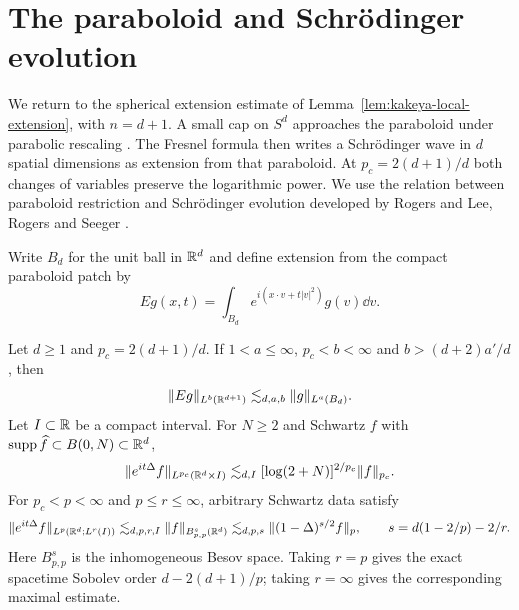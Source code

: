 \section{The paraboloid and Schr\"odinger evolution}\label{sec:parabolic}

We return to the spherical extension estimate of
Lemma~\ref{lem:kakeya-local-extension}, with $n=d+1$. A small cap on
$S^d$ approaches the paraboloid under parabolic rescaling
\cite[\S3, (3.10)--(3.12)]{Hormander1973FLp}. The Fresnel
formula then writes a Schr\"odinger wave in $d$ spatial dimensions as
extension from that paraboloid. At $p_c=2(d+1)/d$ both changes of
variables preserve the logarithmic power. We use the relation between
paraboloid restriction and Schr\"odinger evolution developed by Rogers
\cite{Rogers2008Schrodinger} and Lee, Rogers and Seeger
\cite{LRS2013Schrodinger}.

Write $B_d$ for the unit ball in $\mathbb R^d$ and define extension from the
compact paraboloid patch by
\[
 E g(x,t)=\int_{B_d} e^{i(x\cdot v+t|v|^2)}g(v)\dd v .
\]

\begin{corollary}\label{cor:parabolic}
Let $d\ge1$ and $p_c=2(d+1)/d$. If $1<a\le\infty$, $p_c<b<\infty$
and $b>(d+2)a'/d$, then
\begin{equation}\label{eq:paraboloid-extension-mixed}
 \|Eg\|_{L^b(\mathbb R^{d+1})}\lesssim_{d,a,b}\|g\|_{L^a(B_d)} .
\end{equation}
Let $I\subset\mathbb R$ be a compact interval. For $N\ge2$ and Schwartz $f$ with
$\operatorname{supp}\widehat f\subset B(0,N)\subset\mathbb R^d$,
\begin{equation}\label{eq:parabolic-critical}
 \|e^{it\Delta}f\|_{L^{p_c}(\mathbb R^d\times I)}
 \lesssim_{d,I} [\log(2+N)]^{2/p_c}\|f\|_{p_c}.
\end{equation}
For $p_c<p<\infty$ and $p\le r\le\infty$, arbitrary Schwartz data satisfy
\begin{equation}\label{eq:parabolic-exact}
 \|e^{it\Delta}f\|_{L^p(\mathbb R^d;L^r(I))}
 \lesssim_{d,p,r,I}\|f\|_{B^s_{p,p}(\mathbb R^d)}
 \lesssim_{d,p,s}\|(1-\Delta)^{s/2}f\|_p,
 \qquad s=d(1-2/p)-2/r .
\end{equation}
Here $B^s_{p,p}$ is the inhomogeneous Besov space. Taking $r=p$ gives
the exact spacetime Sobolev order $d-2(d+1)/p$; taking $r=\infty$
gives the corresponding maximal estimate.
\end{corollary}

